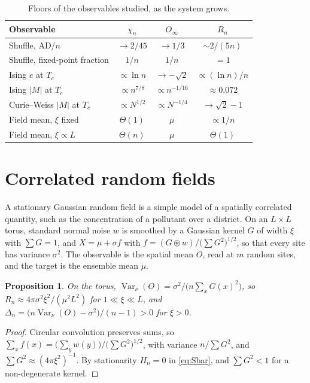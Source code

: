 \documentclass[ba,preprint]{imsart}
\theoremstyle{plain}
\newtheorem{proposition}[theorem]{Proposition}
\theoremstyle{definition}
\newcommand{\Var}{\operatorname{Var}}
\newcommand{\AD}{\mathrm{AD}}
\begin{document}
\begin{table}[t]
\centering
\caption{Floors of the observables studied, as the system grows.}
\label{tab:summary}
\small
\begin{tabular}{lccc}
\toprule
Observable & $\chi_n$ & $O_\infty$ & $R_n$\\
\midrule
Shuffle, $\AD/n$ & $\to2/45$ & $\to1/3$ & $\sim2/(5n)$\\
Shuffle, fixed-point fraction & $1/n$ & $1/n$ & $=1$\\
Ising $e$ at $T_c$ & $\propto\ln n$ & $\to-\sqrt2$ & $\propto(\ln n)/n$\\
Ising $|M|$ at $T_c$ & $\propto n^{7/8}$ & $\propto n^{-1/16}$ & $\approx0.072$\\
Curie--Weiss $|M|$ at $T_c$ & $\propto N^{1/2}$ & $\propto N^{-1/4}$ & $\to\sqrt2-1$\\
Field mean, $\xi$ fixed & $\Theta(1)$ & $\mu$ & $\propto1/n$\\
Field mean, $\xi\propto L$ & $\Theta(n)$ & $\mu$ & $\Theta(1)$\\
\bottomrule
\end{tabular}
\end{table}

\section{Correlated random fields}\label{sec:fields}

A stationary Gaussian random field is a simple model of a spatially correlated quantity, such as the concentration of a pollutant over a district. On an $L\times L$ torus, standard normal noise $w$ is smoothed by a Gaussian kernel $G$ of width $\xi$ with $\sum G=1$, and $X=\mu+\sigma f$ with $f=(G\circledast w)/\bigl(\sum G^2\bigr)^{1/2}$, so that every site has variance $\sigma^2$. The observable is the spatial mean $O$, read at $m$ random sites, and the target is the ensemble mean $\mu$.

\begin{proposition}\label{prop:field}
On the torus, $\Var_\nu(O)=\sigma^2/\bigl(n\sum_xG(x)^2\bigr)$, so $R_n\approx4\pi\sigma^2\xi^2/(\mu^2L^2)$ for $1\ll\xi\ll L$, and $\Delta_n=\bigl(n\Var_\nu(O)-\sigma^2\bigr)/(n-1)>0$ for $\xi>0$.
\end{proposition}

\begin{proof}
Circular convolution preserves sums, so $\sum_xf(x)=\bigl(\sum_yw(y)\bigr)/\bigl(\sum G^2\bigr)^{1/2}$, with variance $n/\sum G^2$, and $\sum G^2\approx(4\pi\xi^2)^{-1}$. By stationarity $H_n=0$ in \eqref{eq:Sbar}, and $\sum G^2<1$ for a non-degenerate kernel.
\end{proof}
\end{document}
